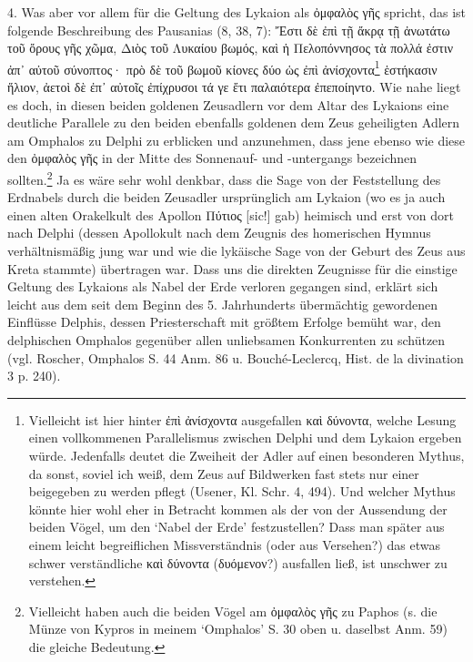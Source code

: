 \documentclass[a4paper, 11pt, oneside]{article}
\begin{document}
4. Was aber vor allem für die Geltung des Lykaion als ὀμφαλὸς γῆς spricht, das ist folgende Beschreibung des Pausanias (8, 38, 7): Ἔστι δὲ ἐπὶ τῇ ἄκρᾳ τῇ ἀνωτάτω τοῦ ὄρους γῆς χῶμα, Διὸς τοῦ Λυκαίου βωμός, καὶ ἡ Πελοπόννησος τὰ πολλά ἐστιν ἀπ᾽ αὐτοῦ σύνοπτος· πρὸ δὲ τοῦ βωμοῦ κίονες δύο ὡς ἐπὶ ἀνίσχοντα\footnote{Vielleicht ist hier hinter ἐπὶ ἀνίσχοντα ausgefallen καὶ δύνοντα, welche Lesung einen vollkommenen Parallelismus zwischen Delphi und dem Lykaion ergeben würde. Jedenfalls deutet die Zweiheit der Adler auf einen besonderen Mythus, da sonst, soviel ich weiß, dem Zeus auf Bildwerken fast stets nur einer beigegeben zu werden pflegt (Usener, Kl. Schr. 4, 494). Und welcher Mythus könnte hier wohl eher in Betracht kommen als der von der Aussendung der beiden Vögel, um den `Nabel der Erde' festzustellen? Dass man später aus einem leicht begreiflichen Missverständnis (oder aus Versehen?) das etwas schwer verständliche καὶ δύνοντα (δυόμενον?) ausfallen ließ, ist unschwer zu verstehen.} ἑστήκασιν ἥλιον, ἀετοὶ δὲ ἐπ᾽ αὐτοῖς ἐπίχρυσοι τά γε ἔτι παλαιότερα ἐπεποίηντο. Wie nahe liegt es doch, in diesen beiden goldenen Zeusadlern vor dem Altar des Lykaions eine deutliche Parallele zu den beiden ebenfalls goldenen dem Zeus geheiligten Adlern am Omphalos zu Delphi zu erblicken und anzunehmen, dass jene ebenso wie diese den ὀμφαλὸς γῆς in der Mitte des Sonnenauf- und -untergangs bezeichnen sollten.\footnote{Vielleicht haben auch die beiden Vögel am ὀμφαλὸς γῆς zu Paphos (s. die Münze von Kypros in meinem `Omphalos' S. 30 oben u. daselbst Anm. 59) die gleiche Bedeutung.} Ja es wäre sehr wohl denkbar, dass die Sage von der Feststellung des Erdnabels durch die beiden Zeusadler ursprünglich am Lykaion (wo es ja auch einen alten Orakelkult des Apollon Πύτιος [sic!] gab) heimisch und erst von dort nach Delphi (dessen Apollokult nach dem Zeugnis des homerischen Hymnus verhältnismäßig jung war und wie die lykäische Sage von der Geburt des Zeus aus Kreta stammte) übertragen war. Dass uns die direkten Zeugnisse für die einstige Geltung des Lykaions als Nabel der Erde verloren gegangen sind, erklärt sich leicht aus dem seit dem Beginn des 5. Jahrhunderts übermächtig gewordenen Einflüsse Delphis, dessen Priesterschaft mit größtem Erfolge bemüht war, den delphischen Omphalos gegenüber allen unliebsamen Konkurrenten zu schützen (vgl. Roscher, Omphalos S. 44 Anm. 86 u. Bouché-Leclercq, Hist. de la divination 3 p. 240).
\end{document}
